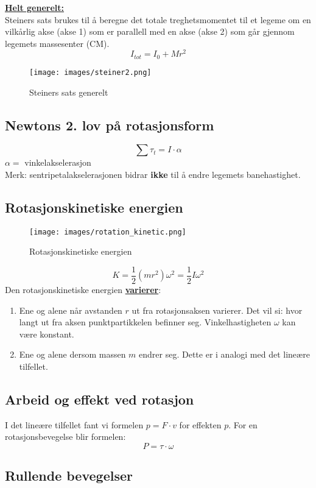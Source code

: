 \documentclass[12pt]{article}
\begin{document}
\underline{\textbf{Helt generelt:}}\\
Steiners sats brukes til å beregne det totale treghetsmomentet til et legeme om en vilkårlig akse (akse 1) som er parallell med en akse (akse 2) som går gjennom legemets massesenter (CM).
$$I_{tot} = I_0 + Mr^2$$
\begin{figure} [H]
    \centering
    \texttt{[image: images/steiner2.png]}
    \caption{Steiners sats generelt}
\end{figure}


\subsection{Newtons 2. lov på rotasjonsform}
$$\sum \tau_t = I\cdot \alpha$$
$\alpha =$ vinkelakselerasjon\\
Merk: sentripetalakselerasjonen bidrar \textbf{ikke} til å endre legemets banehastighet.


\subsection{Rotasjonskinetiske energien}
\begin{figure} [H]
    \centering
    \texttt{[image: images/rotation\_kinetic.png]}
    \caption{Rotasjonskinetiske energien}
\end{figure}
$$K = \frac{1}{2}(mr^2)\omega^2 = \frac{1}{2}I\omega^2$$
Den rotasjonskinetiske energien \underline{\textbf{varierer}}:
\begin{enumerate}
    \item Ene og alene når avstanden $r$ ut fra rotasjonsaksen varierer. Det vil si: hvor langt ut fra aksen punktpartikkelen befinner seg. Vinkelhastigheten $\omega$ kan være konstant.
    \item Ene og alene dersom massen $m$ endrer seg. Dette er i analogi med det lineære tilfellet.
\end{enumerate}

\subsection{Arbeid og effekt ved rotasjon}
I det lineære tilfellet fant vi formelen $p = F\cdot v$ for effekten $p$.
For en rotasjonsbevegelse blir formelen:
$$P = \tau \cdot \omega$$

\subsection{Rullende bevegelser}
\end{document}
